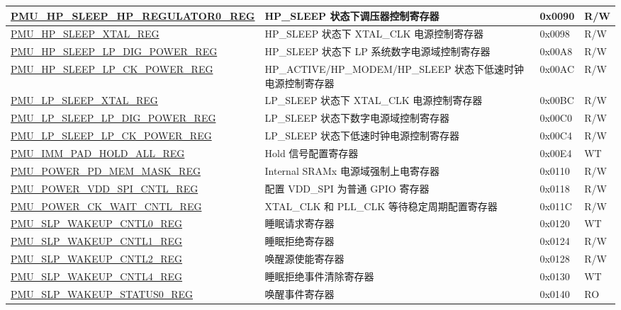 \begin{longtable}{ | l | p{6cm} | l | l | }
\hyperref[regdesc:PMUHPSLEEPHPREGULATOR0REG]{PMU\_HP\_SLEEP\_HP\_REGULATOR0\_REG} & HP\_SLEEP 状态下调压器控制寄存器 & 0x0090 & R/W \\ \hline
\hyperref[regdesc:PMUHPSLEEPXTALREG]{PMU\_HP\_SLEEP\_XTAL\_REG} & HP\_SLEEP 状态下 XTAL\_CLK 电源控制寄存器 & 0x0098 & R/W \\ \hline
\hyperref[regdesc:PMUHPSLEEPLPDIGPOWERREG]{PMU\_HP\_SLEEP\_LP\_DIG\_POWER\_REG} &  HP\_SLEEP 状态下 LP 系统数字电源域控制寄存器 & 0x00A8 & R/W \\ \hline
\hyperref[regdesc:PMUHPSLEEPLPCKPOWERREG]{PMU\_HP\_SLEEP\_LP\_CK\_POWER\_REG} & HP\_ACTIVE/HP\_MODEM/HP\_SLEEP 状态下低速时钟电源控制寄存器 & 0x00AC & R/W \\ \hline
\hyperref[regdesc:PMULPSLEEPXTALREG]{PMU\_LP\_SLEEP\_XTAL\_REG} & LP\_SLEEP 状态下 XTAL\_CLK 电源控制寄存器 & 0x00BC & R/W \\ \hline
\hyperref[regdesc:PMULPSLEEPLPDIGPOWERREG]{PMU\_LP\_SLEEP\_LP\_DIG\_POWER\_REG} & LP\_SLEEP 状态下数字电源域控制寄存器 & 0x00C0 & R/W \\ \hline
\hyperref[regdesc:PMULPSLEEPLPCKPOWERREG]{PMU\_LP\_SLEEP\_LP\_CK\_POWER\_REG} & LP\_SLEEP 状态下低速时钟电源控制寄存器 & 0x00C4 & R/W \\ \hline
\hyperref[regdesc:PMUIMMPADHOLDALLREG]{PMU\_IMM\_PAD\_HOLD\_ALL\_REG} & Hold 信号配置寄存器& 0x00E4 & WT \\ \hline
\hyperref[regdesc:PMUPOWERPDMEMMASKREG]{PMU\_POWER\_PD\_MEM\_MASK\_REG} & Internal SRAMx 电源域强制上电寄存器& 0x0110 & R/W \\ \hline
\hyperref[regdesc:PMUPOWERVDDSPICNTLREG]{PMU\_POWER\_VDD\_SPI\_CNTL\_REG} & 配置 VDD\_SPI 为普通 GPIO 寄存器 & 0x0118 & R/W \\ \hline
\hyperref[regdesc:PMUPOWERCKWAITCNTLREG]{PMU\_POWER\_CK\_WAIT\_CNTL\_REG} & XTAL\_CLK 和 PLL\_CLK 等待稳定周期配置寄存器 & 0x011C & R/W \\ \hline
\hyperref[regdesc:PMUSLPWAKEUPCNTL0REG]{PMU\_SLP\_WAKEUP\_CNTL0\_REG} & 睡眠请求寄存器 & 0x0120 & WT \\ \hline
\hyperref[regdesc:PMUSLPWAKEUPCNTL1REG]{PMU\_SLP\_WAKEUP\_CNTL1\_REG} & 睡眠拒绝寄存器 & 0x0124 & R/W \\ \hline
\hyperref[regdesc:PMUSLPWAKEUPCNTL2REG]{PMU\_SLP\_WAKEUP\_CNTL2\_REG} & 唤醒源使能寄存器 & 0x0128 & R/W \\ \hline
\hyperref[regdesc:PMUSLPWAKEUPCNTL4REG]{PMU\_SLP\_WAKEUP\_CNTL4\_REG} & 睡眠拒绝事件清除寄存器 & 0x0130 & WT \\ \hline
\hyperref[regdesc:PMUSLPWAKEUPSTATUS0REG]{PMU\_SLP\_WAKEUP\_STATUS0\_REG} & 唤醒事件寄存器 & 0x0140 & RO \\ \hline

\end{longtable}
